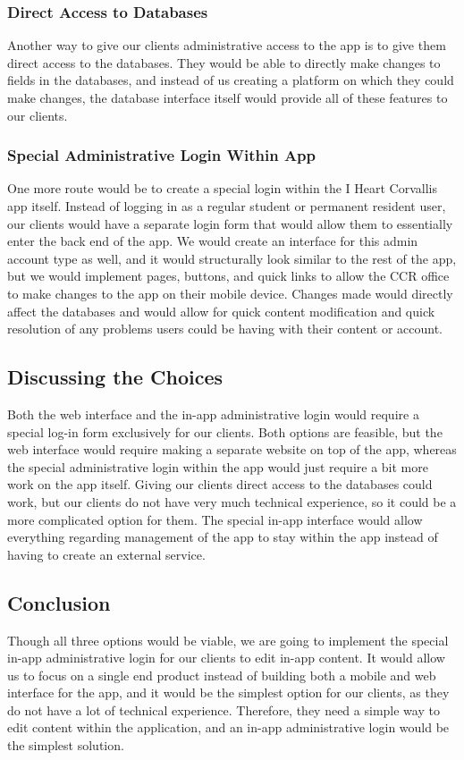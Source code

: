 \documentclass[draftclsnofoot, onecolumn, 10pt, compsoc]{IEEEtran}
\begin{document}
			\subsubsection{\textbf{Direct Access to Databases}}
			Another way to give our clients administrative access to the app is to give them direct access to the databases. They would be able to directly make changes to fields in the databases, and instead of us creating a platform on which they could make changes, the database interface itself would provide all of these features to our clients.
			\subsubsection{\textbf{Special Administrative Login Within App}}
			One more route would be to create a special login within the I Heart Corvallis app itself. Instead of logging in as a regular student or permanent resident user, our clients would have a separate login form that would allow them to essentially enter the back end of the app. We would create an interface for this admin account type as well, and it would structurally look similar to the rest of the app, but we would implement pages, buttons, and quick links to allow the CCR office to make changes to the app on their mobile device. Changes made would directly affect the databases and would allow for quick content modification and quick resolution of any problems users could be having with their content or account.
		
		\subsection{Discussing the Choices}
			Both the web interface and the in-app administrative login would require a special log-in form exclusively for our clients. Both options are feasible, but the web interface would require making a separate website on top of the app, whereas the special administrative login within the app would just require a bit more work on the app itself. Giving our clients direct access to the databases could work, but our clients do not have very much technical experience, so it could be a more complicated option for them. The special in-app interface would allow everything regarding management of the app to stay within the app instead of having to create an external service.
		
		\subsection{Conclusion}
			Though all three options would be viable, we are going to implement the special in-app administrative login for our clients to edit in-app content. It would allow us to focus on a single end product instead of building both a mobile and web interface for the app, and it would be the simplest option for our clients, as they do not have a lot of technical experience. Therefore, they need a simple way to edit content within the application, and an in-app administrative login would be the simplest solution.
		
	
	
	
\end{document}

